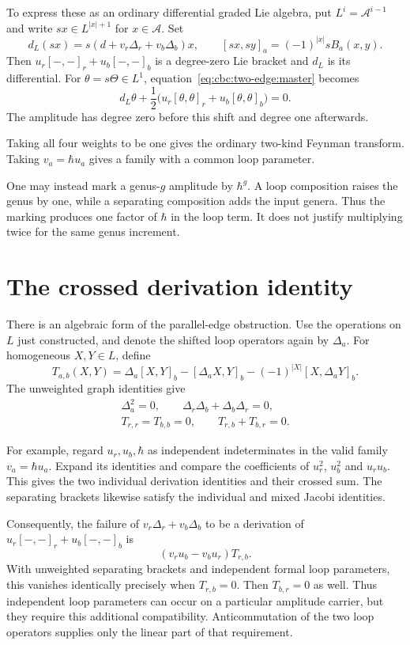 To express these as an ordinary differential graded Lie algebra, put $L^i=\mathcal A^{i-1}$ and write $sx\in L^{|x|+1}$ for $x\in\mathcal A$.
Set
\[
 d_L(sx)=s(d+v_r\Delta_r+v_b\Delta_b)x,
 \qquad
 [sx,sy]_a=(-1)^{|x|}sB_a(x,y).
\]
Then $u_r[-,-]_r+u_b[-,-]_b$ is a degree-zero Lie bracket and $d_L$ is its differential.
For $\theta=s\Theta\in L^1$, equation~\eqref{eq:cbc:two-edge:master} becomes
\[
 d_L\theta+\frac12\bigl(u_r[\theta,\theta]_r+u_b[\theta,\theta]_b\bigr)=0.
\]
The amplitude has degree zero before this shift and degree one afterwards.

Taking all four weights to be one gives the ordinary two-kind Feynman transform.
Taking $v_a=\hbar u_a$ gives a family with a common loop parameter.

One may instead mark a genus-$g$ amplitude by $\hbar^g$.
A loop composition raises the genus by one, while a separating composition adds the input genera.
Thus the marking produces one factor of $\hbar$ in the loop term.
It does not justify multiplying twice for the same genus increment.

\section{The crossed derivation identity}

There is an algebraic form of the parallel-edge obstruction.
Use the operations on $L$ just constructed, and denote the shifted loop operators again by $\Delta_a$.
For homogeneous $X,Y\in L$, define
\[
 T_{a,b}(X,Y)=\Delta_a[X,Y]_b
       -[\Delta_aX,Y]_b-(-1)^{|X|}[X,\Delta_aY]_b.
\]
The unweighted graph identities give
\begin{gather*}
 \Delta_a^2=0,\qquad
 \Delta_r\Delta_b+\Delta_b\Delta_r=0,\\
 T_{r,r}=T_{b,b}=0,\qquad T_{r,b}+T_{b,r}=0.
\end{gather*}

For example, regard $u_r,u_b,\hbar$ as independent indeterminates in the valid family $v_a=\hbar u_a$.
Expand its identities and compare the coefficients of $u_r^2$, $u_b^2$ and $u_ru_b$.
This gives the two individual derivation identities and their crossed sum.
The separating brackets likewise satisfy the individual and mixed Jacobi identities.

Consequently, the failure of $v_r\Delta_r+v_b\Delta_b$ to be a derivation of $u_r[-,-]_r+u_b[-,-]_b$ is
\begin{equation}\label{eq:cbc:two-edge:crossed-defect}
 (v_ru_b-v_bu_r)T_{r,b}.
\end{equation}
With unweighted separating brackets and independent formal loop parameters, this vanishes identically precisely when $T_{r,b}=0$.
Then $T_{b,r}=0$ as well.
Thus independent loop parameters can occur on a particular amplitude carrier, but they require this additional compatibility.
Anticommutation of the two loop operators supplies only the linear part of that requirement.

